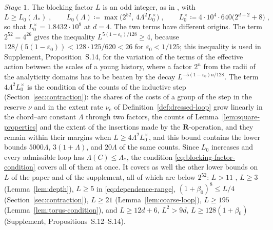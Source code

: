 \documentclass[11pt]{preprint}
\numberwithin{equation}{section}
\theoremstyle{definition}
\theoremstyle{remark}
\theoremstyle{plain}
\begin{document}
\emph{Stage $1$.} The blocking factor $L$ is an odd integer, as in \cite[p.~251]{BalabanRG1}, with
\begin{equation}\label{eq:blocking-factor-condition}
    L \geq L_0(\Lambda_*)\;,
    \qquad
    L_0(\Lambda) \coloneqq \max\bigl(2^{52},\, 4\Lambda^2L_0^\times\bigr)\;,
    \qquad
    L_0^\times \coloneqq 4 \cdot 10^4 \cdot 640\bigl(2^{d+2} + 8\bigr)\;,
\end{equation}
so that $L_0^\times = 1.8432 \cdot 10^9$ at $d = 4$. The two terms have different origins. The term $2^{52} = 4^{26}$ gives the inequality $L^{5(1-\varepsilon_0)/128} \geq 4$, because $128/(5(1 - \varepsilon_0)) < 128 \cdot 125/620 < 26$ for $\varepsilon_0 < 1/125$; this inequality is used in Supplement, Proposition~S.14, for the variation of the terms of the effective action between the scales of a young history, where a factor $2^{n}$ from the radii of the analyticity domains has to be beaten by the decay $L^{-5(1-\varepsilon_0)n/128}$. The term $4\Lambda^2L_0^\times$ is the condition of the counts of the inductive step (Section~\ref{sec:contraction}): the shares of the costs of a group of the step in the reserve $\nu$ and in the extent rate $\nu_e$ of Definition~\ref{def:dressed-loop} grow linearly in the chord--arc constant $\Lambda$ through two factors, the counts of Lemma~\ref{lem:square-properties} and the extent of the insertions made by the $\mathbf R$-operation, and they remain within their margins when $L \geq 4\Lambda^2L_0^\times$, and this bound contains the lower bounds $5000\Lambda$, $3(1 + \Lambda)$, and $20\Lambda$ of the same counts. Since $L_0$ increases and every admissible loop has $\Lambda(C) \leq \Lambda_*$, the condition \eqref{eq:blocking-factor-condition} covers all of them at once. It covers as well the other lower bounds on $L$ of the paper and of the supplement, all of which are below $2^{52}$: $L > 11$ \cite[p.~251]{BalabanRG1}, $L \geq 3$ (Lemma~\ref{lem:depth}), $L \geq 5$ in \eqref{eq:dependence-range}, $(1 + \beta_0)^8 \leq L/4$ (Section~\ref{sec:contraction}), $L \geq 21$ (Lemma~\ref{lem:coarse-loop}), $L \geq 195$ (Lemma~\ref{lem:torus-condition}), and $L \geq 12d + 6$, $L^2 > 9d$, $L \geq 128(1 + \beta_0)$ (Supplement, Propositions~S.12--S.14).
\end{document}
